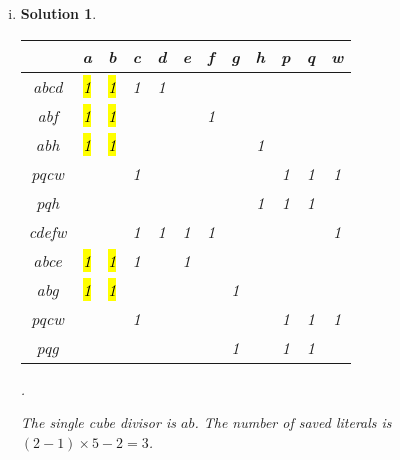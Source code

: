 \documentclass[acmlarge,screen=true,anonymous=false,11pt]{acmart}
\newtheorem*{solution*}{Solution}
\begin{document}
\begin{enumerate}[(i)]
\item \begin{solution*}
    \begin{tabular}{c|ccccccccccc}
    & a & b & c & d & e & f & g & h & p & q & w \\\midrule
    abcd & \hl{1} & \hl{1} & 1 & 1 &   &   &   &   &   &   &   \\
    abf  & \hl{1} & \hl{1} &   &   &   & 1 &   &   &   &   &   \\
    abh  & \hl{1} & \hl{1} &  &  &   &   &   & 1 &   &   &   \\
    pqcw &   &   & 1 &   &   &   &   &   & 1 & 1 & 1 \\
    pqh  &   &   &   &   &   &   &   & 1 & 1 & 1 &   \\
    cdefw&   &   & 1 & 1 & 1 & 1 &   &   &   &   & 1 \\\midrule
    abce  & \hl{1} & \hl{1} & 1 &   & 1 &   &   &   &   &   &   \\
    abg   & \hl{1} & \hl{1} &   &   &   &   & 1 &   &   &   &   \\
    pqcw  &   &   & 1 &   &   &   &   &   & 1 & 1 & 1 \\
    pqg   &   &   &   &   &   &   & 1 &   & 1 & 1 &
\end{tabular}.

The single cube divisor is $ab$. The number of saved literals is $(2 - 1) \times 5 - 2 = 3$.
\end{solution*}


\end{enumerate}
\end{document}
